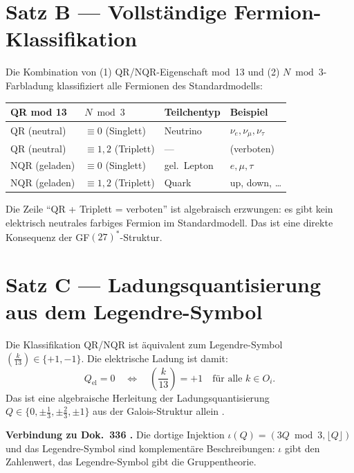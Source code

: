 \section{Satz B --- Vollständige Fermion-Klassifikation}

\begin{theorem}
Die Kombination von (1) QR/NQR-Eigenschaft mod~13 und (2) $N\bmod3$-Farbladung
klassifiziert alle Fermionen des Standardmodells:
\begin{center}
\begin{tabular}{llll}
\toprule
QR mod 13 & $N \bmod 3$ & Teilchentyp & Beispiel \\
\midrule
QR (neutral) & $\equiv 0$ (Singlett) & Neutrino & $\nu_e,\nu_\mu,\nu_\tau$ \\
QR (neutral) & $\equiv 1,2$ (Triplett) & --- & (verboten) \\
NQR (geladen) & $\equiv 0$ (Singlett) & gel.\ Lepton & $e,\mu,\tau$ \\
NQR (geladen) & $\equiv 1,2$ (Triplett) & Quark & up, down, \ldots \\
\bottomrule
\end{tabular}
\end{center}
\end{theorem}

Die Zeile ``QR + Triplett = verboten'' ist algebraisch erzwungen:
es gibt kein elektrisch neutrales farbiges Fermion im Standardmodell.
Das ist eine direkte Konsequenz der GF$(27)^*$-Struktur.

\section{Satz C --- Ladungsquantisierung aus dem Legendre-Symbol}

Die Klassifikation QR/NQR ist äquivalent zum Legendre-Symbol
$\left(\frac{k}{13}\right)\in\{+1,-1\}$. Die elektrische Ladung ist damit:
\[
  Q_\mathrm{el} = 0 \quad\Longleftrightarrow\quad \left(\frac{k}{13}\right)=+1
  \quad \text{für alle } k \in O_i.
\]
Das ist eine algebraische Herleitung der Ladungsquantisierung $Q\in\{0,\pm\frac{1}{3},\pm\frac{2}{3},\pm1\}$
aus der Galois-Struktur allein \BM.

\textbf{Verbindung zu Dok.~336 \BM.} Die dortige Injektion $\iota(Q)=(3Q\bmod3,\lfloor Q\rfloor)$
und das Legendre-Symbol sind komplementäre Beschreibungen:
$\iota$ gibt den Zahlenwert, das Legendre-Symbol gibt die Gruppentheorie.

